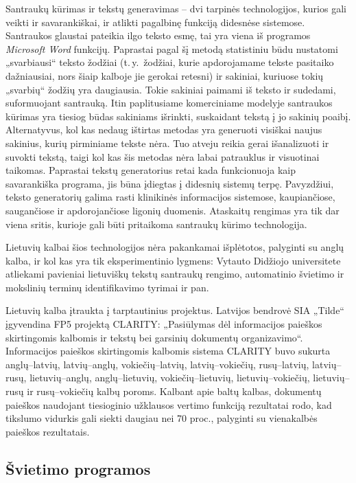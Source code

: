 \begin{multicols}{2}
   Santraukų kūrimas ir tekstų generavimas – dvi tarpinės technologijos, kurios gali veikti ir savarankiškai, ir atlikti pagalbinę funkciją didesnėse sistemose. Santraukos glaustai pateikia ilgo teksto esmę, tai yra viena iš programos \textit{Microsoft Word} funkcijų. Paprastai pagal šį metodą statistiniu būdu nustatomi „svarbiausi“ teksto žodžiai (t.\,y.~žodžiai, kurie apdorojamame tekste pasitaiko dažniausiai, nors šiaip kalboje jie gerokai retesni) ir sakiniai, kuriuose tokių „svarbių“ žodžių yra daugiausia. Tokie sakiniai paimami iš teksto ir sudedami, suformuojant santrauką. Itin paplitusiame komerciniame modelyje santraukos kūrimas yra tiesiog būdas sakiniams išrinkti, suskaidant tekstą į jo sakinių poaibį. Alternatyvus, kol kas nedaug ištirtas metodas yra generuoti visiškai naujus sakinius, kurių pirminiame tekste nėra. Tuo atveju reikia gerai išanalizuoti ir suvokti tekstą, taigi kol kas šis metodas nėra labai patrauklus ir visuotinai taikomas. Paprastai tekstų generatorius retai kada funkcionuoja kaip savarankiška programa, jis būna įdiegtas į didesnių sistemų terpę. Pavyzdžiui, teksto generatorių galima rasti klinikinės informacijos sistemose, kaupiančiose, saugančiose ir apdorojančiose ligonių duomenis. Ataskaitų rengimas yra tik dar viena sritis, kurioje gali būti pritaikoma santraukų kūrimo technologija.   

    Lietuvių kalbai šios technologijos nėra pakankamai išplėtotos, palyginti su anglų kalba, ir kol kas yra tik eksperimentinio lygmens: Vytauto Didžiojo universitete atliekami pavieniai lietuviškų tekstų santraukų rengimo, automatinio švietimo ir mokslinių terminų identifikavimo tyrimai ir pan.    

   Lietuvių kalba įtraukta į tarptautinius projektus. Latvijos bendrovė SIA „Tilde“ įgyvendina  FP5 projektą CLARITY: „Pasiūlymas dėl informacijos paieškos skirtingomis kalbomis ir tekstų bei garsinių dokumentų organizavimo“. Informacijos paieškos skirtingomis kalbomis sistema CLARITY buvo sukurta anglų–latvių, latvių–anglų, vokiečių–latvių, latvių–vokiečių, rusų–latvių, latvių–rusų, lietuvių–anglų, anglų–lietuvių, vokiečių–lietuvių, lietuvių–vokiečių, lietuvių–rusų ir rusų–vokiečių kalbų poroms. Kalbant apie baltų kalbas, dokumentų paieškos naudojant tiesioginio užklausos vertimo funkciją rezultatai rodo, kad tikslumo vidurkis gali siekti daugiau nei 70 proc., palyginti su vienakalbės paieškos rezultatais.

\subsection{Švietimo programos}


\end{multicols}

